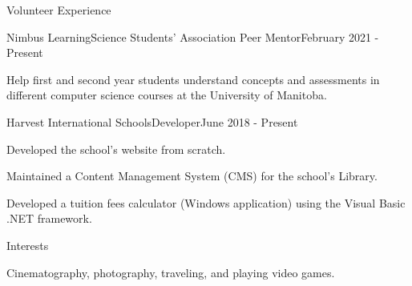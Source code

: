 \documentclass{article}
\newlength{\tabin}
\newlength{\secsep}
\newcommand{\lineunder}{\vspace*{-8pt} \\ \hspace*{-6pt} \hrulefill \\ \vspace*{-15pt}}
\newenvironment{tabbedsection}[1]{
    \begin{list}{}{
        \setlength{\itemsep}{0pt}
        \setlength{\labelsep}{0pt}
        \setlength{\labelwidth}{0pt}
        \setlength{\leftmargin}{\tabin}
        \setlength{\rightmargin}{\tabin}
        \setlength{\listparindent}{0pt}
        \setlength{\parsep}{0pt}
        \setlength{\parskip}{0pt}
        \setlength{\partopsep}{0pt}
        \setlength{\topsep}{#1}
    }
        \item[]
        }{
    \end{list}}
\newenvironment{nospacetabbing}{
    \begin{tabbing}
    }{\end{tabbing}\vspace{-1.2em}}
\newenvironment{resume_section}[1]{
    \filbreak
    \vspace{2\secsep}
    \textsc{\large#1}
    \lineunder
    \begin{tabbedsection}{\secsep}
    }{\end{tabbedsection}}
\newenvironment{subitems}{
    \renewcommand{\labelitemi}{-}
    \begin{itemize}
        \setlength{\labelsep}{1em}
        }{
    \end{itemize}}
\newenvironment{resume_employer}[4]{
    \vspace{\secsep}
    \begin{minipage}[t]{0.75\linewidth}
        \textbf{#1}\\
        \small #2
    \end{minipage}%
    \begin{minipage}[t]{0.25\linewidth}
        \hfill \footnotesize #4
    \end{minipage}
    \vspace{0.1em}\\
    \begin{tabbedsection}{0pt}
        \begin{subitems}
        }{\end{subitems}
    \end{tabbedsection}}
\begin{document}
    \begin{resume_section}{Volunteer Experience}
        \begin{resume_employer}{Nimbus Learning}{Science Students' Association Peer Mentor}{}{February 2021 - Present}
            \item Help first and second year students understand concepts and assessments in different computer
            science courses at the University of Manitoba.

        \end{resume_employer}

        \begin{resume_employer}{Harvest International Schools}{Developer}{}{June 2018 - Present}
            \item Developed the school's website from scratch.

            \item Maintained a Content Management System (CMS) for the school's Library.

            \item Developed a tuition fees calculator (Windows application) using the Visual Basic .NET framework.
        \end{resume_employer}
    \end{resume_section}


    \begin{resume_section}{Interests}
    	\begin{nospacetabbing}
            Cinematography, photography, traveling, and playing video games.
    	\end{nospacetabbing}
    \end{resume_section}
\end{document}
